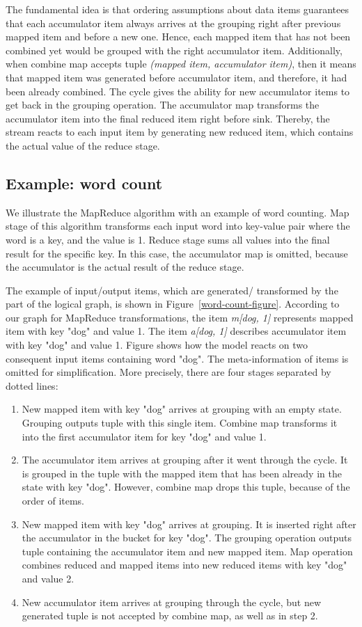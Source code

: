 The fundamental idea is that ordering assumptions about data items guarantees that each accumulator item always arrives at the grouping right after previous mapped item and before a new one. Hence, each mapped item that has not been combined yet would be grouped with the right accumulator item. Additionally, when combine map accepts tuple {\it (mapped item, accumulator item)}, then it means that mapped item was generated before accumulator item, and therefore, it had been already combined. The cycle gives the ability for new accumulator items to get back in the grouping operation. The accumulator map transforms the accumulator item into the final reduced item right before sink. Thereby, the stream reacts to each input item by generating new reduced item, which contains the actual value of the reduce stage.

\subsection{Example: word count}

We illustrate the MapReduce algorithm with an example of word counting. Map stage of this algorithm transforms each input word into key-value pair where the word is a key, and the value is 1. Reduce stage sums all values into the final result for the specific key. In this case, the accumulator map is omitted, because the accumulator is the actual result of the reduce stage.

The example of input/output items, which are generated/ transformed by the part of the logical graph, is shown in Figure~\ref {word-count-figure}. According to our graph for MapReduce transformations, the item {\it m[dog, 1]} represents mapped item with key "dog" and value 1. The item {\it a[dog, 1]} describes accumulator item with key "dog" and value 1. Figure shows how the model reacts on two consequent input items containing word "dog". The meta-information of items is omitted for simplification. More precisely, there are four stages separated by dotted lines:

\begin{enumerate}
    \item New mapped item with key "dog" arrives at grouping with an empty state. Grouping outputs tuple with this single item. Combine map transforms it into the first accumulator item for key "dog" and value 1.
    \item The accumulator item arrives at grouping after it went through the cycle. It is grouped in the tuple with the mapped item that has been already in the state with key "dog". However, combine map drops this tuple, because of the order of items.
    \item New mapped item with key "dog" arrives at grouping. It is inserted right after the accumulator in the bucket for key "dog". The grouping operation outputs tuple containing the accumulator item and new mapped item. Map operation combines reduced and mapped items into new reduced items with key "dog" and value 2.
    \item New accumulator item arrives at grouping through the cycle, but new generated tuple is not accepted by combine map, as well as in step 2.
\end{enumerate}

